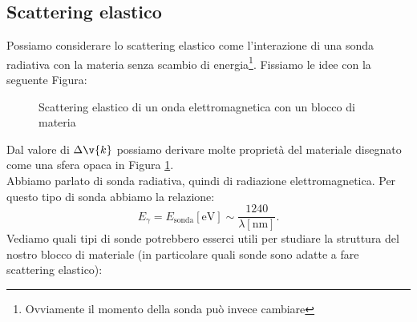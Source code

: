 \subsection{Scattering elastico}
\label{subsec:Diffusione elasica}
Possiamo considerare lo scattering elastico come l'interazione di una sonda radiativa con la materia senza scambio di energia\footnote{Ovviamente il momento della sonda può invece cambiare}. Fissiamo le idee con la seguente Figura:
\begin{figure}[H]
    \centering
    \caption{Scattering elastico di un onda elettromagnetica con un blocco di materia}
    \label{fig:scattering-elastico-di-un-onda-elettromagnetica-con-un-blocco-di-materia}
\end{figure}
\noindent
Dal valore di $\Delta\v{k}$ possiamo derivare molte proprietà del materiale disegnato come una sfera opaca in Figura \ref{fig:scattering-elastico-di-un-onda-elettromagnetica-con-un-blocco-di-materia}.\\
Abbiamo parlato di sonda radiativa, quindi di radiazione elettromagnetica. Per questo tipo di sonda abbiamo la relazione:
\[
	E_{\gamma} = E_\text{sonda}[\text{eV}] \sim \frac{1240}{\lambda [\text{nm}]}
.\] 
Vediamo quali tipi di sonde potrebbero esserci utili per studiare la struttura del nostro blocco di materiale (in particolare quali sonde sono adatte a fare scattering elastico):
